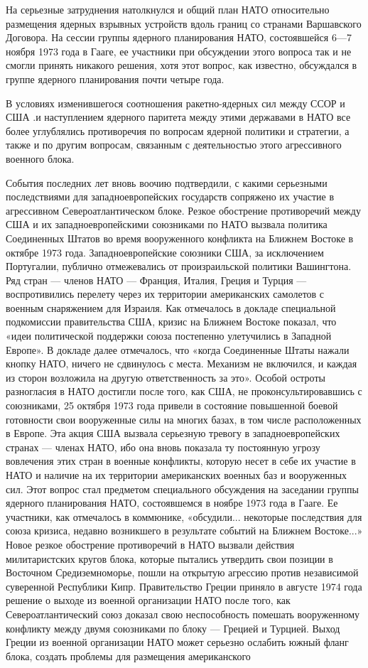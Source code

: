 \documentclass[12pt, a4paper, openany]{book}
\begin{document}
	На серьезные затруднения натолкнулся и общий план НАТО относительно размещения ядерных взрывных устройств вдоль границ со странами Варшавского Договора. На сессии группы ядерного планирования НАТО, состоявшейся 6—7 ноября 1973 года в Гааге, ее участники при обсуждении этого вопроса так и не смогли принять никакого решения, хотя этот вопрос, как известно, обсуждался в группе ядерного планирования почти четыре года.
	
	В условиях изменившегося соотношения ракетно-ядерных сил между ССОР и США .и наступлением ядерного паритета между этими державами в НАТО все более углублялись противоречия по вопросам ядерной политики и стратегии, а также и по другим вопросам, связанным с деятельностью этого агрессивного военного блока.
	
	События последних лет вновь воочию подтвердили, с какими серьезными последствиями для западноевропейских государств сопряжено их участие в агрессивном Североатлантическом блоке. Резкое обострение противоречий между США и их западноевропейскими союзниками по НАТО вызвала политика Соединенных Штатов во время вооруженного конфликта на Ближнем Востоке в октябре 1973 года. Западноевропейские союзники США, за исключением Португалии, публично отмежевались от произраильской политики Вашингтона. Ряд стран — членов НАТО — Франция, Италия, Греция и Турция — воспротивились перелету через их территории американских самолетов с военным снаряжением для Израиля. Как отмечалось в докладе специальной подкомиссии правительства США, кризис на Ближнем Востоке показал, что «идеи политической поддержки союза постепенно улетучились в Западной Европе». В докладе далее отмечалось, что «когда Соединенные Штаты нажали кнопку НАТО, ничего не сдвинулось с места. Механизм не включился, и каждая из сторон возложила на другую ответственность за это». Особой остроты разногласия в НАТО достигли после того, как США, не проконсультировавшись с союзниками, 25 октября 1973 года привели в состояние повышенной боевой готовности свои вооруженные силы на многих базах, в том числе расположенных в Европе. Эта акция США вызвала серьезную тревогу в западноевропейских странах — членах НАТО, ибо она вновь показала ту постоянную угрозу вовлечения этих стран в военные конфликты, которую несет в себе их участие в НАТО и наличие на их территории американских военных баз и вооруженных сил. Этот вопрос стал предметом специального обсуждения на заседании группы ядерного планирования НАТО, состоявшемся в ноябре 1973 года в Гааге. Ее участники, как отмечалось в коммюнике, «обсудили... некоторые последствия для союза кризиса, недавно возникшего в результате событий на Ближнем Востоке...» Новое резкое обострение противоречий в НАТО вызвали действия милитаристских кругов блока, которые пытались утвердить свои позиции в Восточном Средиземноморье, пошли на открытую агрессию против независимой суверенной Республики Кипр. Правительство Греции приняло в августе 1974 года решение о выходе из военной организации НАТО после того, как Североатлантический союз доказал свою неспособность помешать вооруженному конфликту между двумя союзниками по блоку — Грецией и Турцией. Выход Греции из военной организации НАТО может серьезно ослабить южный фланг блока, создать проблемы для размещения американского 
\end{document}
